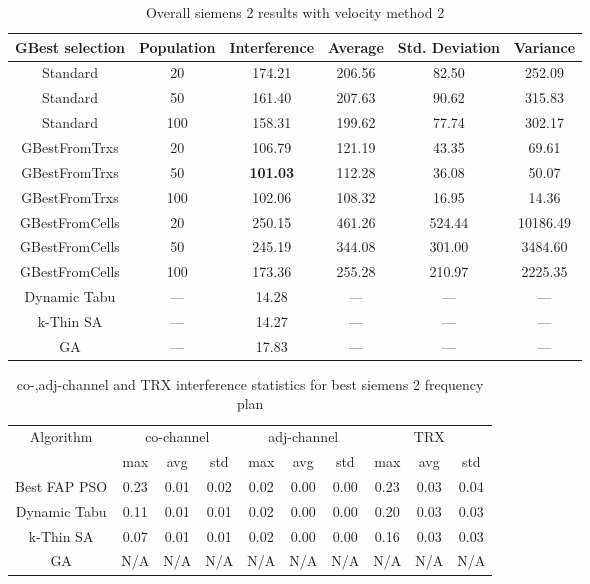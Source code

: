 \begin{table}[H]
\centering
	\begin{tabular}{cccccc}
	\toprule
    GBest selection & Population & Interference & Average & Std. Deviation & Variance \\
    \midrule
    Standard & 20 & 174.21 & 206.56 &  82.50 & 252.09\\
    Standard & 50 & 161.40 & 207.63 &  90.62 & 315.83\\
    Standard & 100 & 158.31 & 199.62 &  77.74 & 302.17\\
    GBestFromTrxs & 20 & 106.79 & 121.19 &  43.35 &  69.61\\
    GBestFromTrxs & 50 & \textbf{101.03} & 112.28 &  36.08 &  50.07\\
    GBestFromTrxs & 100 & 102.06 & 108.32 &  16.95 &  14.36\\
    GBestFromCells & 20 & 250.15 & 461.26 & 524.44 & 10186.49\\
    GBestFromCells & 50 & 245.19 & 344.08 & 301.00 & 3484.60\\
    GBestFromCells & 100 & 173.36 & 255.28 & 210.97 & 2225.35\\
    \midrule
    Dynamic Tabu & --- & 14.28 & --- & --- & --- \\
    k-Thin SA & --- & 14.27 & --- & --- & --- \\
    GA & --- & 17.83 & --- & --- & --- \\
    \bottomrule
	\end{tabular}
\caption{Overall siemens 2 results with velocity method 2}
\label{tab:siem2m2}
\end{table}
\begin{table}[H]
\centering
	\begin{tabular}{cccccccccc}
	\toprule
    Algorithm & \multicolumn{3}{c}{co-channel} & \multicolumn{3}{c}{adj-channel} & \multicolumn{3}{c}{TRX}\\
              & max & avg & std
              & max & avg & std
              & max & avg & std\\
    \midrule
    Best FAP PSO & 0.23 & 0.01 & 0.02 & 0.02 & 0.00 & 0.00 & 0.23 & 0.03 & 0.04 \\
    Dynamic Tabu & 0.11 & 0.01 & 0.01 & 0.02 & 0.00 & 0.00 & 0.20 & 0.03 & 0.03\\
    k-Thin SA & 0.07 & 0.01 & 0.01 & 0.02 & 0.00 & 0.00 & 0.16 & 0.03 & 0.03\\
    GA & \scriptsize{N/A} & \scriptsize{N/A} & \scriptsize{N/A} & \scriptsize{N/A} & \scriptsize{N/A} & \scriptsize{N/A} & \scriptsize{N/A} & \scriptsize{N/A} & \scriptsize{N/A}\\
    \bottomrule
	\end{tabular}
\caption{co-,adj-channel and TRX interference statistics for best siemens 2 frequency plan}
\label{tab:stats-siem2m1}
\end{table}
